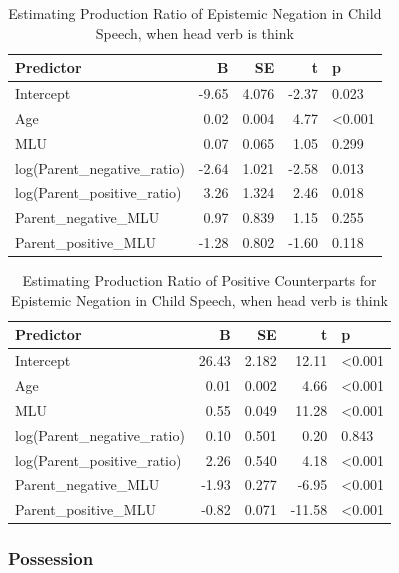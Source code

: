 \documentclass[
  english,
  man,floatsintext]{apa6}
\begin{document}
\begin{table}

\caption{\label{tab:unnamed-chunk-9}Estimating Production Ratio of Epistemic Negation in Child Speech, when head verb is think}
\centering
\begin{tabular}[t]{l|r|r|r|l}
\hline
Predictor & B & SE & t & p\\
\hline
Intercept & -9.65 & 4.076 & -2.37 & 0.023\\
\hline
Age & 0.02 & 0.004 & 4.77 & <0.001\\
\hline
MLU & 0.07 & 0.065 & 1.05 & 0.299\\
\hline
log(Parent\_negative\_ratio) & -2.64 & 1.021 & -2.58 & 0.013\\
\hline
log(Parent\_positive\_ratio) & 3.26 & 1.324 & 2.46 & 0.018\\
\hline
Parent\_negative\_MLU & 0.97 & 0.839 & 1.15 & 0.255\\
\hline
Parent\_positive\_MLU & -1.28 & 0.802 & -1.60 & 0.118\\
\hline
\end{tabular}
\end{table}

\begin{table}

\caption{\label{tab:unnamed-chunk-9}Estimating Production Ratio of Positive Counterparts for Epistemic Negation in Child Speech, when head verb is think}
\centering
\begin{tabular}[t]{l|r|r|r|l}
\hline
Predictor & B & SE & t & p\\
\hline
Intercept & 26.43 & 2.182 & 12.11 & <0.001\\
\hline
Age & 0.01 & 0.002 & 4.66 & <0.001\\
\hline
MLU & 0.55 & 0.049 & 11.28 & <0.001\\
\hline
log(Parent\_negative\_ratio) & 0.10 & 0.501 & 0.20 & 0.843\\
\hline
log(Parent\_positive\_ratio) & 2.26 & 0.540 & 4.18 & <0.001\\
\hline
Parent\_negative\_MLU & -1.93 & 0.277 & -6.95 & <0.001\\
\hline
Parent\_positive\_MLU & -0.82 & 0.071 & -11.58 & <0.001\\
\hline
\end{tabular}
\end{table}

\clearpage

\hypertarget{possession}{%
\subsubsection{Possession}\label{possession}}
\end{document}
